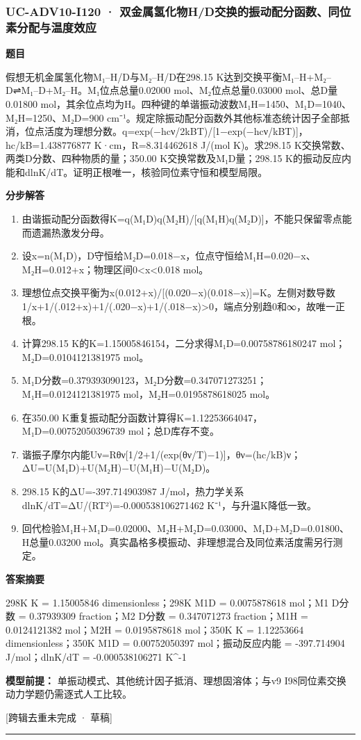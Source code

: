 \documentclass[UTF8,11pt,a4paper]{ctexart}
\begin{document}
\subsubsection*{UC-ADV10-I120 · 双金属氢化物H/D交换的振动配分函数、同位素分配与温度效应}
\noindent\textbf{题目}\par
假想无机金属氢化物M₁–H/D与M₂–H/D在298.15 K达到交换平衡M₁–H+M₂–D⇌M₁–D+M₂–H。M₁位点总量0.02000 mol、M₂位点总量0.03000 mol、总D量0.01800 mol，其余位点均为H。四种键的单谐振动波数M₁H=1450、M₁D=1040、M₂H=1250、M₂D=900 cm⁻¹。规定除振动配分函数外其他标准态统计因子全部抵消，位点活度为理想分数。q=exp(−hcν/2kBT)/[1−exp(−hcν/kBT)]，hc/kB=1.438776877 K·cm，R=8.314462618 J/(mol K)。求298.15 K交换常数、两类D分数、四种物质的量；350.00 K交换常数及M₁D量；298.15 K的振动反应内能和dlnK/dT。证明正根唯一，核验同位素守恒和模型局限。\par
\medskip\noindent\textbf{分步解答}
\begin{enumerate}
\item 由谐振动配分函数得K=q(M₁D)q(M₂H)/[q(M₁H)q(M₂D)]，不能只保留零点能而遗漏热激发分母。
\item 设x=n(M₁D)，D守恒给M₂D=0.018−x，位点守恒给M₁H=0.020−x、M₂H=0.012+x；物理区间0<x<0.018 mol。
\item 理想位点交换平衡为x(0.012+x)/[(0.020−x)(0.018−x)]=K。左侧对数导数1/x+1/(.012+x)+1/(.020−x)+1/(.018−x)>0，端点分别趋0和∞，故唯一正根。
\item 计算298.15 K的K=1.15005846154，二分求得M₁D=0.00758786180247 mol；M₂D=0.0104121381975 mol。
\item M₁D分数=0.379393090123，M₂D分数=0.347071273251；M₁H=0.0124121381975 mol，M₂H=0.0195878618025 mol。
\item 在350.00 K重复振动配分函数计算得K=1.12253664047，M₁D=0.00752050396739 mol；总D库存不变。
\item 谐振子摩尔内能Uν=Rθν[1/2+1/(exp(θν/T)−1)]，θν=(hc/kB)ν；ΔU=U(M₁D)+U(M₂H)−U(M₁H)−U(M₂D)。
\item 298.15 K的ΔU=-397.714903987 J/mol，热力学关系dlnK/dT=ΔU/(RT²)=-0.000538106271462 K⁻¹，与升温K降低一致。
\item 回代检验M₁H+M₁D=0.02000、M₂H+M₂D=0.03000、M₁D+M₂D=0.01800、H总量0.03200 mol。真实晶格多模振动、非理想混合及同位素活度需另行测定。
\end{enumerate}
\noindent\textbf{答案摘要}\par
298K K = 1.15005846 dimensionless；298K M1D = 0.0075878618 mol；M1 D分数 = 0.37939309 fraction；M2 D分数 = 0.347071273 fraction；M1H = 0.0124121382 mol；M2H = 0.0195878618 mol；350K K = 1.12253664 dimensionless；350K M1D = 0.00752050397 mol；振动反应内能 = -397.714904 J/mol；dlnK/dT = -0.000538106271 K\textasciicircum{}-1\par
\noindent\textbf{模型前提：}
单振动模式、其他统计因子抵消、理想固溶体；与v9 I98同位素交换动力学题仍需逐式人工比较。\par
\noindent\textcolor{red!65!black}{[跨辑去重未完成 · 草稿]} \par
\medskip\hrule\medskip
{}
\end{document}
